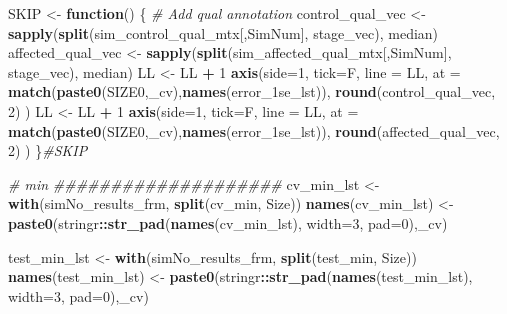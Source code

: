 \documentclass[
]{book}
\newenvironment{Shaded}{\begin{snugshade}}{\end{snugshade}}
\newcommand{\CommentTok}[1]{\textcolor[rgb]{0.56,0.35,0.01}{\textit{#1}}}
\newcommand{\ControlFlowTok}[1]{\textcolor[rgb]{0.13,0.29,0.53}{\textbf{#1}}}
\newcommand{\DataTypeTok}[1]{\textcolor[rgb]{0.13,0.29,0.53}{#1}}
\newcommand{\DecValTok}[1]{\textcolor[rgb]{0.00,0.00,0.81}{#1}}
\newcommand{\KeywordTok}[1]{\textcolor[rgb]{0.13,0.29,0.53}{\textbf{#1}}}
\newcommand{\NormalTok}[1]{#1}
\newcommand{\OperatorTok}[1]{\textcolor[rgb]{0.81,0.36,0.00}{\textbf{#1}}}
\newcommand{\StringTok}[1]{\textcolor[rgb]{0.31,0.60,0.02}{#1}}
\begin{document}
\begin{Shaded}
\begin{Highlighting}[]
\NormalTok{SKIP  <{-}}\StringTok{ }\ControlFlowTok{function}\NormalTok{() \{}
\CommentTok{\# Add qual annotation}
\NormalTok{control\_qual\_vec <{-}}\StringTok{ }\KeywordTok{sapply}\NormalTok{(}\KeywordTok{split}\NormalTok{(sim\_control\_qual\_mtx[,SimNum], stage\_vec), median)}
\NormalTok{affected\_qual\_vec <{-}}\StringTok{ }\KeywordTok{sapply}\NormalTok{(}\KeywordTok{split}\NormalTok{(sim\_affected\_qual\_mtx[,SimNum], stage\_vec), median)}
\NormalTok{LL <{-}}\StringTok{ }\NormalTok{LL }\OperatorTok{+}\StringTok{ }\DecValTok{1}
\KeywordTok{axis}\NormalTok{(}\DataTypeTok{side=}\DecValTok{1}\NormalTok{, }\DataTypeTok{tick=}\NormalTok{F, }\DataTypeTok{line =}\NormalTok{ LL,}
  \DataTypeTok{at =} \KeywordTok{match}\NormalTok{(}\KeywordTok{paste0}\NormalTok{(SIZE0,}\StringTok{\textquotesingle{}\_cv\textquotesingle{}}\NormalTok{),}\KeywordTok{names}\NormalTok{(error\_1se\_lst)),}
  \KeywordTok{round}\NormalTok{(control\_qual\_vec, }\DecValTok{2}\NormalTok{)}
\NormalTok{ )}
\NormalTok{LL <{-}}\StringTok{ }\NormalTok{LL }\OperatorTok{+}\StringTok{ }\DecValTok{1}
\KeywordTok{axis}\NormalTok{(}\DataTypeTok{side=}\DecValTok{1}\NormalTok{, }\DataTypeTok{tick=}\NormalTok{F, }\DataTypeTok{line =}\NormalTok{ LL,}
  \DataTypeTok{at =} \KeywordTok{match}\NormalTok{(}\KeywordTok{paste0}\NormalTok{(SIZE0,}\StringTok{\textquotesingle{}\_cv\textquotesingle{}}\NormalTok{),}\KeywordTok{names}\NormalTok{(error\_1se\_lst)),}
  \KeywordTok{round}\NormalTok{(affected\_qual\_vec, }\DecValTok{2}\NormalTok{)}
\NormalTok{ )}
\NormalTok{\}}\CommentTok{\#SKIP}

\CommentTok{\# min}
\CommentTok{\#\#\#\#\#\#\#\#\#\#\#\#\#\#\#\#\#\#\#\#}
\NormalTok{cv\_min\_lst <{-}}\StringTok{ }\KeywordTok{with}\NormalTok{(simNo\_results\_frm,}
 \KeywordTok{split}\NormalTok{(cv\_min, Size))}
\KeywordTok{names}\NormalTok{(cv\_min\_lst) <{-}}\StringTok{ }\KeywordTok{paste0}\NormalTok{(stringr}\OperatorTok{::}\KeywordTok{str\_pad}\NormalTok{(}\KeywordTok{names}\NormalTok{(cv\_min\_lst), }\DataTypeTok{width=}\DecValTok{3}\NormalTok{, }\DataTypeTok{pad=}\StringTok{\textquotesingle{}0\textquotesingle{}}\NormalTok{),}\StringTok{\textquotesingle{}\_cv\textquotesingle{}}\NormalTok{)}

\NormalTok{test\_min\_lst <{-}}\StringTok{ }\KeywordTok{with}\NormalTok{(simNo\_results\_frm,}
 \KeywordTok{split}\NormalTok{(test\_min, Size))}
\KeywordTok{names}\NormalTok{(test\_min\_lst) <{-}}\StringTok{ }\KeywordTok{paste0}\NormalTok{(stringr}\OperatorTok{::}\KeywordTok{str\_pad}\NormalTok{(}\KeywordTok{names}\NormalTok{(test\_min\_lst), }\DataTypeTok{width=}\DecValTok{3}\NormalTok{, }\DataTypeTok{pad=}\StringTok{\textquotesingle{}0\textquotesingle{}}\NormalTok{),}\StringTok{\textquotesingle{}\_cv\textquotesingle{}}\NormalTok{)}


\end{Highlighting}
\end{Shaded}
\end{document}
